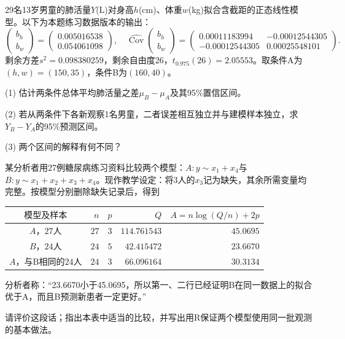 29名13岁男童的肺活量$Y$(L)对身高$h$(cm)、体重$w$(kg)拟合含截距的正态线性模型。以下为本题练习数据版本的输出：\[\begin{pmatrix}b_h\\b_w\end{pmatrix}=\begin{pmatrix}0.005016538\\0.054061098\end{pmatrix},\quad\widehat{\operatorname{Cov}}\!\begin{pmatrix}b_h\\b_w\end{pmatrix}=\begin{pmatrix}0.00011183994&-0.00012544305\\-0.00012544305&0.00025548101\end{pmatrix}.\]剩余方差$s^2=0.098380259$，剩余自由度26，$t_{0.975}(26)=2.05553$。取条件A为$(h,w)=(150,35)$，条件B为$(160,40)$。\par (1) 估计两条件总体平均肺活量之差$\mu_B-\mu_A$及其95\%置信区间。\par (2) 若从两条件下各新观察1名男童，二者误差相互独立并与建模样本独立，求$Y_B-Y_A$的95\%预测区间。\par (3) 两个区间的解释有何不同？

某分析者用27例糖尿病练习资料比较两个模型：$A:y\sim x_1+x_4$与$B:y\sim x_1+x_2+x_3+x_4$。现作教学设定：将3人的$x_3$记为缺失，其余所需变量均完整。按模型分别删除缺失记录后，得到\begin{center}\small\setlength{\tabcolsep}{5pt}
\begin{tabular}{crrrr}
\toprule
$\text{模型及样本}$ & $n$ & $p$ & $Q$ & $A=n\log(Q/n)+2p$ \\
\midrule
$A\text{，27人}$ & $27$ & $3$ & $114.761543$ & $45.0695$ \\
$B\text{，24人}$ & $24$ & $5$ & $42.415472$ & $23.6670$ \\
$A\text{，与B相同的24人}$ & $24$ & $3$ & $66.096164$ & $30.3134$ \\
\bottomrule
\end{tabular}
\end{center}分析者称：“23.6670小于45.0695，所以第一、二行已经证明B在同一数据上的拟合优于A，而且B预测新患者一定更好。”\par 请评价这段话；指出本表中适当的比较，并写出用R保证两个模型使用同一批观测的基本做法。
